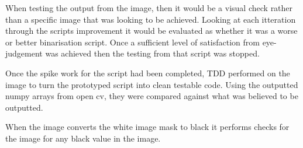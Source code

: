 When testing the output from the image, then it would be a visual check rather than a specific image that was looking to be achieved. Looking at each itteration through the scripts improvement it would be evaluated as whether it was a worse or better binarisation script. Once a sufficient level of satisfaction from eye-judgement was achieved then the testing from that script was stopped.

Once the spike work for the script had been completed, TDD performed on the image to turn the prototyped script into clean testable code. Using the outputted numpy arrays from open cv, they were compared against what was believed to be outputted.

When the image converts the white image mask to black it performs checks for the image for any black value in the image.
